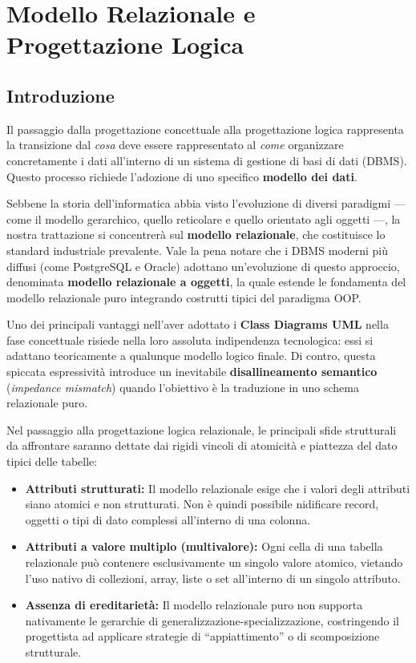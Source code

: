 \chapter{Modello Relazionale e Progettazione Logica}

\section{Introduzione}

Il passaggio dalla progettazione concettuale alla progettazione logica rappresenta la transizione dal \textit{cosa} deve essere rappresentato al \textit{come} organizzare concretamente i dati all'interno di un sistema di gestione di basi di dati (DBMS). Questo processo richiede l'adozione di uno specifico \textbf{modello dei dati}.

Sebbene la storia dell'informatica abbia visto l'evoluzione di diversi paradigmi — come il modello gerarchico, quello reticolare e quello orientato agli oggetti —, la nostra trattazione si concentrerà sul \textbf{modello relazionale}, che costituisce lo standard industriale prevalente. Vale la pena notare che i DBMS moderni più diffusi (come PostgreSQL e Oracle) adottano un'evoluzione di questo approccio, denominata \textbf{modello relazionale a oggetti}, la quale estende le fondamenta del modello relazionale puro integrando costrutti tipici del paradigma OOP.

\medskip

Uno dei principali vantaggi nell'aver adottato i \textbf{Class Diagrams UML} nella fase concettuale risiede nella loro assoluta indipendenza tecnologica: essi si adattano teoricamente a qualunque modello logico finale. Di contro, questa spiccata espressività introduce un inevitabile \textbf{disallineamento semantico} (\textit{impedance mismatch}) quando l'obiettivo è la traduzione in uno schema relazionale puro. 

Nel passaggio alla progettazione logica relazionale, le principali sfide strutturali da affrontare saranno dettate dai rigidi vincoli di atomicità e piattezza del dato tipici delle tabelle:
\begin{itemize}
    \item \textbf{Attributi strutturati:} Il modello relazionale esige che i valori degli attributi siano atomici e non strutturati. Non è quindi possibile nidificare record, oggetti o tipi di dato complessi all'interno di una colonna.
    \item \textbf{Attributi a valore multiplo (multivalore):} Ogni cella di una tabella relazionale può contenere esclusivamente un singolo valore atomico, vietando l'uso nativo di collezioni, array, liste o set all'interno di un singolo attributo.
    \item \textbf{Assenza di ereditarietà:} Il modello relazionale puro non supporta nativamente le gerarchie di generalizzazione-specializzazione, costringendo il progettista ad applicare strategie di ``appiattimento'' o di scomposizione strutturale.
\end{itemize}


